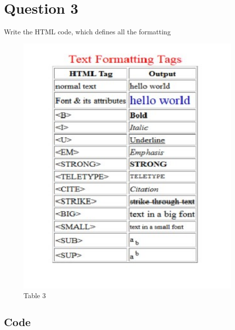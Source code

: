 \documentclass{extarticle}
\begin{document}
\newpage
\section*{Question 3}

Write the HTML code, which defines all the formatting

\begin{figure}[H]
    \caption{Table 3}
    \centering
    \includegraphics[width=13cm]{./img/c.jpg}
\end{figure}

\newpage
\subsection*{Code}


\newpage
\end{document}
